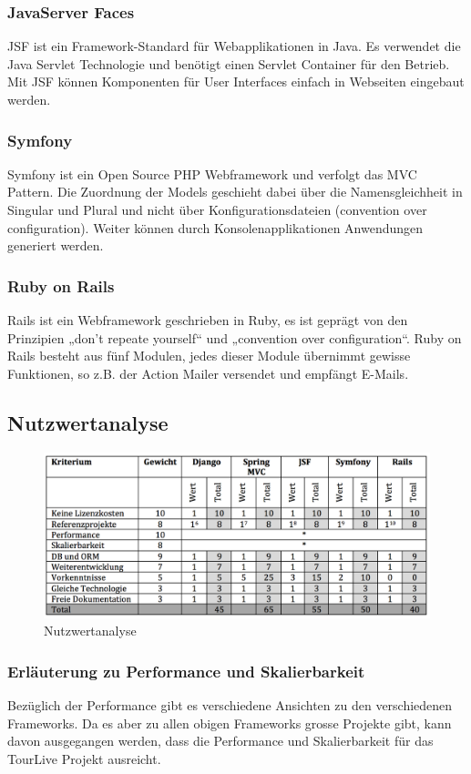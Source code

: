 \subsubsection{JavaServer Faces}
JSF ist ein Framework-Standard für Webapplikationen in Java. Es verwendet die Java Servlet Technologie und benötigt einen Servlet Container für den Betrieb. Mit JSF können Komponenten für User Interfaces einfach in Webseiten eingebaut werden. 
\subsubsection{Symfony}
Symfony ist ein Open Source PHP Webframework und verfolgt das MVC Pattern. Die Zuordnung der Models geschieht dabei über die Namensgleichheit in Singular und Plural und nicht über Konfigurationsdateien (convention over configuration). Weiter können durch Konsolenapplikationen Anwendungen generiert werden.
\subsubsection{Ruby on Rails}
Rails ist ein Webframework geschrieben in Ruby, es ist geprägt von den Prinzipien „don’t repeate yourself“ und „convention over configuration“. Ruby on Rails besteht aus fünf Modulen, jedes dieser Module übernimmt gewisse Funktionen, so z.B. der Action Mailer versendet und empfängt E-Mails.
\subsection{Nutzwertanalyse}
\begin{figure}[H]
	\includegraphics[width=130mm]{images/nutzwertanalyse.png}
	\caption{Nutzwertanalyse}
\end{figure}
\subsubsection{Erläuterung zu Performance und Skalierbarkeit}
Bezüglich der Performance gibt es verschiedene Ansichten zu den verschiedenen Frameworks. Da es aber zu allen obigen Frameworks grosse Projekte gibt, kann davon ausgegangen werden, dass die Performance und Skalierbarkeit für das TourLive Projekt ausreicht.
